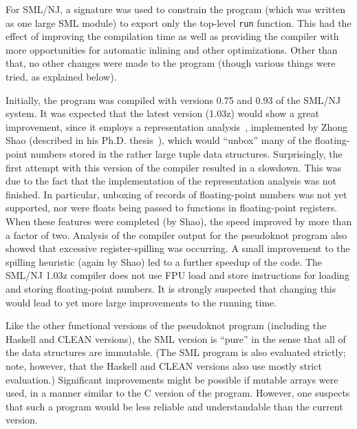 For SML/NJ, a signature was used to constrain the program (which was
written as one large SML module) to export only the top-level
\verb|run| function. This had the effect of improving the compilation
time as well as providing the compiler with more opportunities for
automatic inlining and other optimizations. Other than that, no other
changes were made to the program (though various things were tried, as
explained below).

Initially, the program was compiled with versions 0.75 and 0.93 of the
SML/NJ system. It was expected that the latest version (1.03z) would
show a great improvement, since it employs a representation
analysis~\cite{Ler92}, implemented by Zhong Shao (described in his
Ph.D. thesis~\cite{Sha94}), which would ``unbox'' many of the
floating-point numbers stored in the rather large tuple data
structures. Surprisingly, the first attempt with this version of the
compiler resulted in a slowdown. This was due to the fact that the
implementation of the representation analysis was not finished. In
particular, unboxing of records of floating-point numbers was not yet
supported, nor were floats being passed to functions in floating-point
registers. When these features were completed (by Shao), the
speed improved by more than a factor of two. Analysis of the compiler
output for the pseudoknot program also showed that excessive
register-spilling was occurring. A small improvement to the spilling
heuristic (again by Shao) led to a further speedup of the code. The
SML/NJ 1.03z compiler does not use FPU load and store instructions for
loading and storing floating-point numbers. It is strongly suspected
that changing this would lead to yet more large improvements to the
running time.

Like the other functional versions of the pseudoknot program (including
the Haskell and CLEAN versions), the SML version is ``pure'' in the
sense that all of the data structures are immutable. (The SML program
is also evaluated strictly; note, however, that the Haskell and CLEAN
versions also use mostly strict evaluation.) Significant improvements
might be possible if mutable arrays were used, in a manner similar to
the C version of the program. However, one suspects that such a
program would be less reliable and understandable than the current
version.

